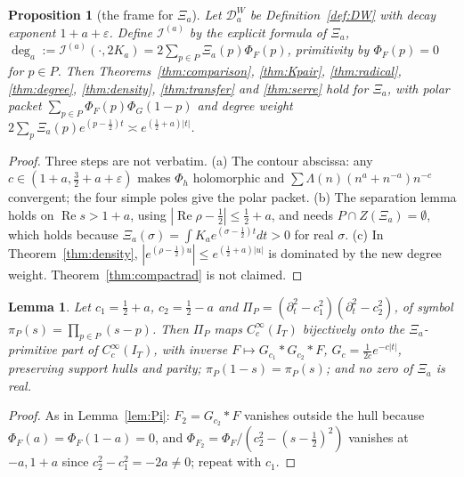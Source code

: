 \documentclass[11pt]{amsart}
\newtheorem{proposition}[theorem]{Proposition}
\newtheorem{lemma}[theorem]{Lemma}
\theoremstyle{definition}
\theoremstyle{remark}
\newcommand{\Rel}{\operatorname{Re}}
\newcommand{\DW}{\mathcal D^{W}}
\newcommand{\I}{\mathcal I}
\newcommand{\dg}{\deg}
\begin{document}
\begin{proposition}[the frame for $\Xi_a$]\label{prop:xiaframe}
Let $\DW_a$ be Definition~\ref{def:DW} with decay exponent $1+a+\varepsilon$. Define $\I^{(a)}$ by the explicit
formula of $\Xi_a$, $\dg_a:=\I^{(a)}(\cdot,2K_a)=2\sum_{p\in P}\Xi_a(p)\Phi_F(p)$, primitivity by $\Phi_F(p)=0$ for $p\in P$.
Then Theorems~\ref{thm:comparison}, \ref{thm:Kpair}, \ref{thm:radical}, \ref{thm:degree}, \ref{thm:density},
\ref{thm:transfer} and \ref{thm:serre} hold for $\Xi_a$, with polar packet $\sum_{p\in P}\Phi_F(p)\Phi_G(1-p)$ and degree weight
$2\sum_p\Xi_a(p)e^{(p-\frac12)t}\asymp e^{(\frac12+a)|t|}$.
\end{proposition}
\begin{proof}
Three steps are not verbatim. (a) The contour abscissa: any $c\in(1+a,\frac32+a+\varepsilon)$ makes $\Phi_h$
holomorphic and $\sum\Lambda(n)(n^a+n^{-a})n^{-c}$ convergent; the four simple poles give the polar packet.
(b) The separation lemma holds on $\Rel s>1+a$, using $|\Rel\rho-\frac12|\le\frac12+a$, and needs $P\cap Z(\Xi_a)=\emptyset$,
which holds because $\Xi_a(\sigma)=\int K_ae^{(\sigma-\frac12)t}dt>0$ for real $\sigma$. (c) In
Theorem~\ref{thm:density}, $|e^{(\rho-\frac12)u}|\le e^{(\frac12+a)|u|}$ is dominated by the new degree weight. Theorem~\ref{thm:compactrad} is not claimed.
\end{proof}

\begin{lemma}\label{lem:PiP}
Let $c_1=\frac12+a$, $c_2=\frac12-a$ and $\Pi_P=(\partial_t^2-c_1^2)(\partial_t^2-c_2^2)$, of symbol $\pi_P(s)=\prod_{p\in P}(s-p)$.
Then $\Pi_P$ maps $C_c^\infty(I_T)$ bijectively onto the $\Xi_a$-primitive part of $C_c^\infty(I_T)$, with inverse
$F\mapsto G_{c_1}\ast G_{c_2}\ast F$, $G_c=\frac1{2c}e^{-c|t|}$, preserving support hulls and parity;
$\pi_P(1-s)=\pi_P(s)$; and no zero of $\Xi_a$ is real.
\end{lemma}
\begin{proof}
As in Lemma~\ref{lem:Pi}: $F_2=G_{c_2}\ast F$ vanishes outside the hull because $\Phi_F(a)=\Phi_F(1-a)=0$, and
$\Phi_{F_2}=\Phi_F/(c_2^2-(s-\frac12)^2)$ vanishes at $-a,1+a$ since $c_2^2-c_1^2=-2a\ne0$; repeat with $c_1$.
\end{proof}
\end{document}
